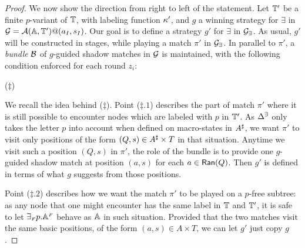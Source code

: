 \begin{proof}
We now show the direction from right to left of the statement. Let $\mathbb{T}'$ be a finite $p$-variant of
$\mathbb{T}$, with labeling function $\kappa'$, and $g$ a winning strategy for $\exists$ in $\mathcal{G} = \mathcal{A}(\mathbb{A},\mathbb{T}')@(a_I,s_I)$. Our goal is to define a strategy $g'$ for $\exists$ in $\mathcal{G_{\exists}}$. As usual, $g'$ will be constructed in stages, while playing a match $\pi'$ in $\mathcal{G_{\exists}}$. In parallel to $\pi'$, a \emph{bundle} $\mathcal{B}$ of $g$-guided shadow matches in $\mathcal{G}$ is maintained, with the following condition enforced for each round $z_i$:
\smallskip
\begin{center}
\hspace*{0.3cm}($\ddag$)
\end{center}
\smallskip
We recall the idea behind ($\ddag$). Point ($\ddag.1$) describes the part of match $\pi'$ where it is still possible to encounter nodes which are labeled with $p$ in $\mathbb{T}'$. As $\Delta^\exists$ only takes the letter $p$ into account when defined on macro-states in $A^{\sharp}$, we want $\pi'$ to visit only positions of the form $(Q,s) \in A^{\sharp} \times T$ in that situation. Anytime we visit such a position $(Q,s)$ in $\pi'$, the role of the bundle is to provide one $g$-guided shadow match at position $(a,s)$ for each $a \in \mathsf{Ran}(Q)$.
Then $g'$ is defined in terms of what $g$ suggests from those positions.

 Point ($\ddag.2$) describes how we want the match $\pi'$ to be
 played on a $p$-free subtree: as any node that one might encounter has the same label in $\mathbb{T}$ and $\mathbb{T}'$,
it is safe to let ${\exists_{{\scriptscriptstyle F}} p}.\mathbb{A}^{{\scriptscriptstyle F}}$ behave as $\mathbb{A}$ in such situation. Provided that the two matches visit the same basic positions, of the form $(a,s)\in A \times T$, we can let $g'$ just copy $g$.


\end{proof}
